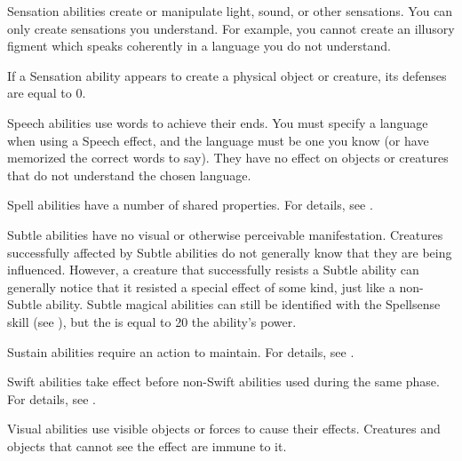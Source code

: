  Sensation abilities create or manipulate light, sound, or other sensations.
You can only create sensations you understand.
For example, you cannot create an illusory figment which speaks coherently in a language you do not understand.
\par If a Sensation ability appears to create a physical object or creature, its defenses are equal to 0.

 Speech abilities use words to achieve their ends.
You must specify a language when using a Speech effect, and the language must be one you know (or have memorized the correct words to say). They have no effect on objects or creatures that do not understand the chosen language.

 Spell abilities have a number of shared properties.
For details, see .

 Subtle abilities have no visual or otherwise perceivable manifestation.
Creatures successfully affected by Subtle abilities do not generally know that they are being influenced.
However, a creature that successfully resists a Subtle ability can generally notice that it resisted a special effect of some kind, just like a non-Subtle ability.
Subtle magical abilities can still be identified with the Spellsense skill (see ), but the  is equal to 20 \add the ability's power.

 Sustain abilities require an action to maintain. For details, see .

 Swift abilities take effect before non-Swift abilities used during the same phase.
For details, see .

 Visual abilities use visible objects or forces to cause their effects.
Creatures and objects that cannot see the effect are immune to it.
